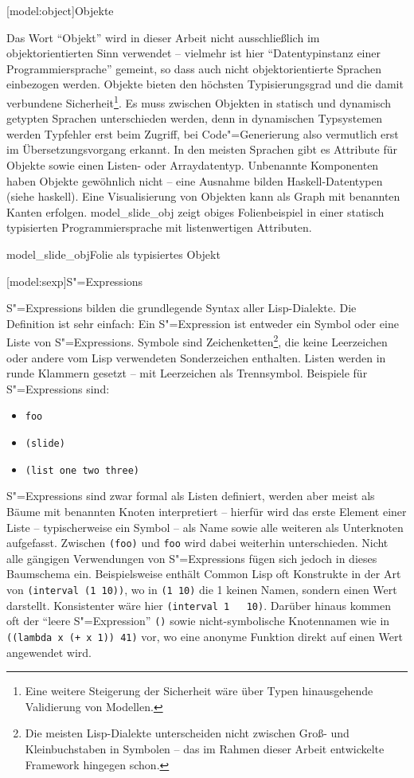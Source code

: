 \documentclass[12pt, a4paper, bibgerm]{scrbook}
\newcommand\icode[1]{\lstinline?#1?}
\newcommand\lsection{}
\newcommand\sref{}
\newcommand\abb{}
\newcommand\fig{}
\newcommand{\sees}[1]{(siehe \sref{#1})}
\newcommand{\sexp}{S"=Expression}
\newcommand{\sexps}{S"=Expressions}
\newcommand{\cgen}{Code"=Generierung}
\begin{document}
\lsection[model:object]{Objekte}

Das Wort ``Objekt'' wird in dieser Arbeit nicht ausschließlich im
objektorientierten Sinn verwendet -- vielmehr ist hier "`Datentypinstanz
einer Programmiersprache"' gemeint, so dass auch nicht objektorientierte
Sprachen einbezogen werden. Objekte bieten den höchsten Typisierungsgrad
und die damit verbundene Sicherheit\footnote{Eine weitere Steigerung der
  Sicherheit wäre über Typen hinausgehende Validierung von
  Modellen.}. Es muss zwischen Objekten in statisch und dynamisch
getypten Sprachen unterschieden werden, denn in dynamischen Typsystemen
werden Typfehler erst beim Zugriff, bei \cgen{} also vermutlich erst im
Übersetzungsvorgang erkannt. In den meisten Sprachen gibt es Attribute
für Objekte sowie einen Listen- oder Arraydatentyp. Unbenannte
Komponenten haben Objekte gewöhnlich nicht -- eine Ausnahme bilden
Haskell-Datentypen \sees{haskell}. Eine Visualisierung von Objekten kann
als Graph mit benannten Kanten erfolgen. \abb{model_slide_obj} zeigt
obiges Folienbeispiel in einer statisch typisierten Programmiersprache
mit listenwertigen Attributen.

\fig{model_slide_obj}{Folie als typisiertes Objekt}

\lsection[model:sexp]{\sexps}

\sexps{} bilden die grundlegende Syntax aller Lisp-Dialekte. Die
Definition ist sehr einfach: Ein \sexp{} ist entweder ein Symbol oder
eine Liste von \sexps{}. Symbole sind Zeichenketten\footnote{Die meisten
  Lisp-Dialekte unterscheiden nicht zwischen Groß- und Kleinbuchstaben
  in Symbolen -- das im Rahmen dieser Arbeit entwickelte Framework
  hingegen schon.}, die keine Leerzeichen oder andere vom Lisp
verwendeten Sonderzeichen enthalten. Listen werden in runde Klammern
gesetzt -- mit Leerzeichen als Trennsymbol. Beispiele für \sexps{} sind:
\begin{itemize}
\item \icode{foo}
\item \icode{(slide)}
\item \icode{(list one two three)}
\end{itemize}

\sexps{} sind zwar formal als Listen definiert, werden aber meist als
Bäume mit benannten Knoten interpretiert -- hierfür wird das erste
Element einer Liste -- typischerweise ein Symbol -- als Name sowie alle
weiteren als Unterknoten aufgefasst. Zwischen \icode{(foo)} und
\icode{foo} wird dabei weiterhin unterschieden. Nicht alle gängigen
Verwendungen von \sexps{} fügen sich jedoch in dieses Baumschema
ein. Beispielsweise enthält Common Lisp oft Konstrukte in der Art von
\icode{(interval (1 10))}, wo in \icode{(1 10)} die 1 keinen Namen,
sondern einen Wert darstellt. Konsistenter wäre hier \icode{(interval 1
  10)}. Darüber hinaus kommen oft der ``leere \sexp{}'' \icode{()} sowie
nicht-symbolische Knotennamen wie in \icode{((lambda x (+ x 1)) 41)}
vor, wo eine anonyme Funktion direkt auf einen Wert angewendet wird.
\end{document}
